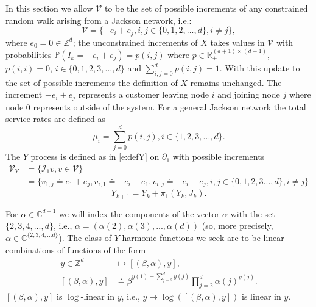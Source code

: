 \documentclass[11pt,a4paper]{article}
\begin{document}
In this section we allow ${\mathcal V}$ to be the set of possible
increments of any constrained random walk arising from a Jackson
network, i.e.:
\[
{\mathcal V} = \{- e_i + e_j, i,j \in \{0,1,2,...,d\}, i \neq j\},
\]
where $e_0 = 0 \in {\mathbb Z}^d$;
the unconstrained increments of $X$ takes values in ${\mathcal V}$
with probabilities ${\mathbb P}(I_k = -e_i +e_j) = p(i,j)$
where $p \in {\mathbb R}_+^{(d+1) \times (d+1)}$, $p(i,i) =0$,
$i \in \{0,1,2,3,...,d\}$ and
$\sum_{i,j=0}^d p(i,j) = 1.$
With this update to the set of possible increments the definition
of $X$ remains unchanged.
The increment $-e_i +e_j$ represents a customer leaving node $i$
and joining node $j$ where node $0$ represents outside of the system.
For a general Jackson network the total service rates are defined as
\[
\mu_i = \sum_{j=0}^d p(i,j), i \in \{1,2,3,...,d\}.
\]
The $Y$ process is defined as in \eqref{e:defY}
on $\partial_1$ with possible increments
\begin{align*}
{\mathcal V}_Y & = \{ {\mathcal I}_1 v, v \in {\mathcal V}\}\\
 & = \{ v_{1,j} \doteq e_1 +e_j, v_{i,1} \doteq -e_i -e_1, 
v_{i,j} \doteq -e_i + e_j, i,j \in \{0,1,2,3...,d\},i \neq j\}
\end{align*}
\begin{equation}\label{d:ygeneral}
Y_{k+1} = Y_k + \pi_1(Y_k, J_k).
\end{equation}


For $\alpha \in {\mathbb C}^{d-1}$ we will index the components
of the vector $\alpha$ with the set 
$\{2,3,4,...,d\}$, i.e.,
$\alpha = (\alpha(2),\alpha(3),...,\alpha(d))$ (so, more precisely,
$\alpha \in {\mathbb C}^{\{2,3,4,...d\}}$).
The class of $Y$-harmonic functions we seek are to be linear
combinations of functions of the form
\begin{align*}
y \in {\mathbb Z}^d &\mapsto [(\beta,\alpha),y],\\
[(\beta,\alpha),y] &\doteq \beta^{y(1)- \sum_{j=2}^d y(j) } 
\prod_{j=2}^d \alpha(j)^{y(j)}.
\end{align*}
$[(\beta,\alpha),y]$ is $\log$-linear in $y$, 
i.e., $y\mapsto \log([(\beta,\alpha),y])$ is 
linear in $y$.
\end{document}
